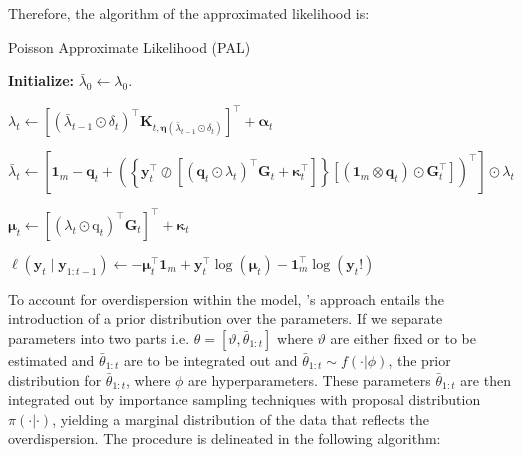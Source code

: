\documentclass[10pt]{article}
\begin{document}
Therefore, the algorithm of the approximated likelihood is:
\vspace{2mm}
\begin{algorithm}
\caption{Poisson Approximate Likelihood (PAL)}
\begin{algorithmic}[1]
\Statex \textbf{Initialize: }$\bar{\lambda}_0 \leftarrow \lambda_0$.
    \item \quad $\lambda_t \leftarrow\left[\left(\bar{\lambda}_{t-1} \odot \delta_t\right)^{\top} \mathbf{K}_{t, \boldsymbol{\eta}\left(\bar{\lambda}_{t-1} \odot \delta_t\right)}\right]^{\top}+\boldsymbol{\alpha}_t$
    \item \quad $\bar{\lambda}_t \leftarrow\left[\mathbf{1}_m-\mathbf{q}_t+\left(\left\{\mathbf{y}_t^{\top} \oslash\left[\left(\mathbf{q}_t \odot \lambda_t\right)^{\top} \mathbf{G}_t+\boldsymbol{\kappa}_t^{\top}\right]\right\}\left[\left(\mathbf{1}_m \otimes \mathbf{q}_t\right) \odot \mathbf{G}_t^{\top}\right]\right)^{\top}\right] \odot \lambda_t$
    \item \quad $\boldsymbol{\mu}_t \leftarrow\left[\left(\lambda_t \odot \mathrm{q}_t\right)^{\top} \mathbf{G}_t\right]^{\top}+\boldsymbol{\kappa}_t$
    \item \quad $\ell\left(\mathbf{y}_t \mid \mathbf{y}_{1: t-1}\right) \leftarrow-\boldsymbol{\mu}_t^{\top} \mathbf{1}_m+\mathbf{y}_t^{\top} \log \left(\boldsymbol{\mu}_t\right)-\mathbf{1}_m^{\top} \log \left(\mathbf{y}_{t} !\right)$
\EndFor
\end{algorithmic}
\end{algorithm}

\newpage 

To account for overdispersion within the model, \cite{wwr}'s approach entails the introduction of a prior distribution over the parameters. If we separate parameters into two parts i.e. $\theta=[\vartheta, \bar{\theta}_{1:t}]$ where $\vartheta$ are either fixed or to be estimated and $\bar{\theta}_{1:t}$ are to be integrated out and $\bar{\theta}_{1:t} \sim f(\cdot|\phi)$, the prior distribution for $\bar{\theta}_{1:t}$, where $\phi$ are hyperparameters. These parameters $\bar{\theta}_{1:t}$ are then integrated out by importance sampling techniques with proposal distribution $\pi(\cdot|\cdot)$, yielding a marginal distribution of the data that reflects the overdispersion. The procedure is delineated in the following algorithm:

\vspace{3mm}
\end{document}

